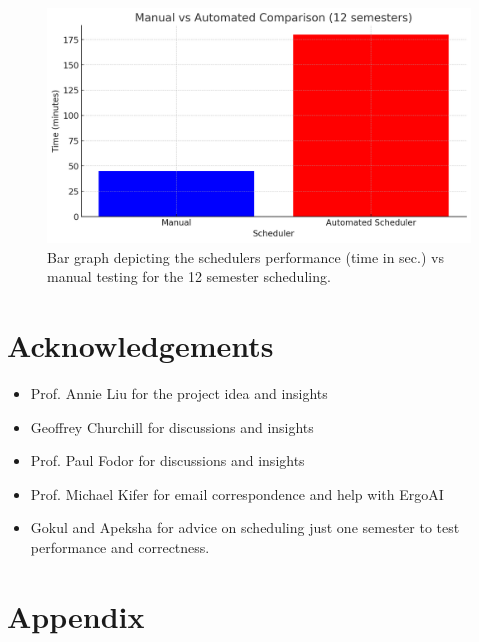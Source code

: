 \documentclass[12pt]{article}
\begin{document}
    \begin{figure}[h!]
        \centering
        \includegraphics[scale=0.5]{figures/eval/bar-graph-12sem.png}
        \caption{Bar graph depicting the schedulers performance (time in sec.) vs manual testing for the 12 semester scheduling.}
        \label{fig:12sem}
    \end{figure}

    \newpage
    
    \section{Acknowledgements}
    \label{sec:ack}

    \begin{itemize}
        \item Prof. Annie Liu for the project idea and insights
        \item Geoffrey Churchill for discussions and insights
        \item Prof. Paul Fodor for discussions and insights
        \item Prof. Michael Kifer for email correspondence and help with ErgoAI
        \item Gokul and Apeksha for advice on scheduling just one semester to test performance and correctness.
    \end{itemize}
    
    \newpage
    
    
    
    

    \newpage
    
    \section{Appendix}
    \label{sec:appendix}
\end{document}
